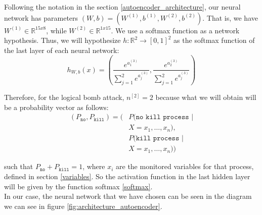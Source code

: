 \documentclass{iosart2c}
\begin{document}
Following the notation in the section \ref{autoencoder_architecture}, our neural network has parameters $(W,b)=(W^{(1)},b^{(1)},W^{(2)},b^{(2)})$. That is, we have $W^{(1)} \in \mathbb {R}^{15x8}$, while $ W^{(2)} \in \mathbb {R}^{1x15}$. We use a softmax function as a network hypothesis. Thus, we will hypothesize $ h: \mathbb {R}^ {2} \rightarrow [0,1] ^ 2 $ as the softmax function of the last layer of each neural network: 
\begin{equation}\label{softmax}
h_{W,b}(x)=\left(\frac{e^{a_1^{(3)}}}{\sum_{j=1}^2 e^{a_j^{(3)}}},\frac{e^{a_2^{(3)}}}{\sum_{j=1}^2 e^{a_j^{(3)}}}\right)
\end{equation}


Therefore, for the logical bomb attack, $n^{[2]}=2$ because what we will obtain will be a probability vector as follows:
\begin{align*}
    (P_{\texttt{no}},P_{\texttt{kill}})=(&P(\texttt{no kill process } | \\
									    & X=x_1,\ldots,x_n),\\
                                         &P(\texttt{kill process } | \\
                                         & X=x_1,\ldots,x_n))
\end{align*}

such that  $P_{\texttt{no}}+P_{\texttt{kill}}=1$, where $x_i$ are the monitored variables for that process, defined in section \ref{variables}. So the activation function in the last hidden layer will be given by the function softmax \ref{softmax}. \\


In our case, the neural network that we have chosen can be seen in the diagram we can see in figure \ref{fig:architecture_autoencoder}.\\
\end{document}
